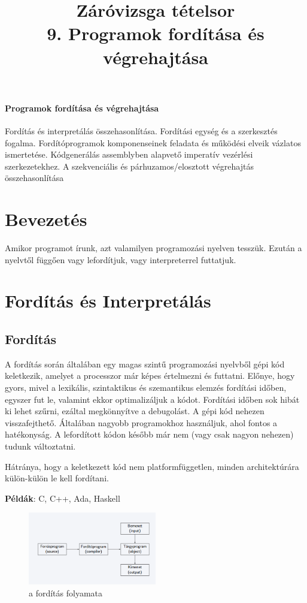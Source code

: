 \documentclass[margin=0px]{article}
\title{Záróvizsga tételsor \\ \large 9. Programok fordítása és végrehajtása}
\date{}
\author{}
\newenvironment{tetel}[1]{\paragraph{#1 \\}}{}
\begin{document}
	\maketitle
	
	\begin{tetel}{ Programok fordítása és végrehajtása }
		Fordítás és interpretálás összehasonlítása. 
		Fordítási egység és a szerkesztés fogalma.
		Fordítóprogramok komponenseinek feladata és működési elveik vázlatos ismertetése.
		Kódgenerálás assemblyben alapvető imperatív vezérlési szerkezetekhez. 
		A szekvenciális és
		párhuzamos/elosztott végrehajtás összehasonlítása
	\end{tetel}
	
\section{Bevezetés}
	
	
	Amikor programot írunk, azt valamilyen programozási nyelven tesszük. Ezután a nyelvtől függően vagy lefordítjuk, vagy interpreterrel futtatjuk.
	
\section{Fordítás és Interpretálás}
	
\subsection{Fordítás}
	
	A fordítás során általában egy magas szintű programozási nyelvből gépi kód keletkezik, amelyet a processzor már képes értelmezni és futtatni. Előnye, hogy gyors, mivel a lexikális, szintaktikus és szemantikus elemzés fordítási időben, egyszer fut le, valamint ekkor optimalizáljuk a kódot. Fordítási időben sok hibát ki lehet szűrni, ezáltal megkönnyítve a debugolást. A gépi kód nehezen visszafejthető. Általában nagyobb programokhoz használjuk, ahol fontos a hatékonyság. A lefordított kódon később már nem (vagy csak nagyon nehezen) tudunk változtatni.
	
	Hátránya, hogy a keletkezett kód nem platformfüggetlen, minden architektúrára külön-külön le kell fordítani.
	
	\textbf{Példák}: C, C++, Ada, Haskell
	
	\begin{figure}[H]
		\centering
		\includegraphics[width=0.5\textwidth]{img/forditas_folyamatabra.png}
		\caption{a fordítás folyamata}
		\label{fig:forditas_folyamatabra}
	\end{figure}
	
\end{document}
